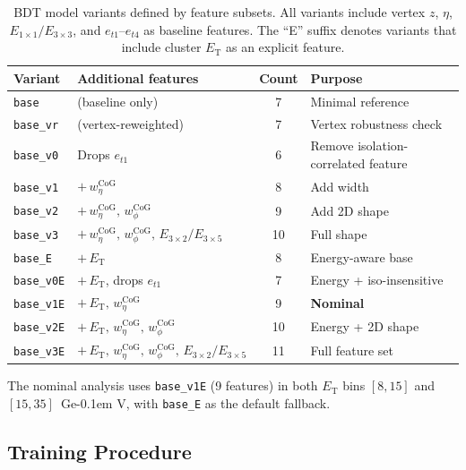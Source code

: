 \documentclass[11pt,a4paper]{article}
\newcommand{\ET}{\ensuremath{E_{\text{T}}}\xspace}
\newcommand{\GeV}{\ifmmode {\mathrm{\ Ge\kern -0.1em V}}\else\textrm{Ge\kern -0.1em V}\fi\xspace}
\begin{document}
\begin{table}[H]
    \centering
    \caption{BDT model variants defined by feature subsets. All variants include
      vertex $z$, $\eta$, $E_{1\times1}/E_{3\times3}$, and $e_{t1}$--$e_{t4}$ as
      baseline features. The ``E'' suffix denotes variants that include cluster
      \ET as an explicit feature.}
    \label{tab:bdt_variants}
    \begin{tabular}{llcl}
        \toprule
        Variant & Additional features & Count & Purpose \\
        \midrule
        \texttt{base}      & (baseline only) & 7 & Minimal reference \\
        \texttt{base\_vr}  & (vertex-reweighted) & 7 & Vertex robustness check \\
        \texttt{base\_v0}  & Drops $e_{t1}$ & 6 & Remove isolation-correlated feature \\
        \texttt{base\_v1}  & $+\,w_\eta^{\text{CoG}}$ & 8 & Add width \\
        \texttt{base\_v2}  & $+\,w_\eta^{\text{CoG}},\,w_\phi^{\text{CoG}}$ & 9 & Add 2D shape \\
        \texttt{base\_v3}  & $+\,w_\eta^{\text{CoG}},\,w_\phi^{\text{CoG}},\,E_{3\times2}/E_{3\times5}$ & 10 & Full shape \\
        \texttt{base\_E}   & $+\,\ET$ & 8 & Energy-aware base \\
        \texttt{base\_v0E} & $+\,\ET$, drops $e_{t1}$ & 7 & Energy + iso-insensitive \\
        \texttt{base\_v1E} & $+\,\ET,\,w_\eta^{\text{CoG}}$ & 9 & \textbf{Nominal} \\
        \texttt{base\_v2E} & $+\,\ET,\,w_\eta^{\text{CoG}},\,w_\phi^{\text{CoG}}$ & 10 & Energy + 2D shape \\
        \texttt{base\_v3E} & $+\,\ET,\,w_\eta^{\text{CoG}},\,w_\phi^{\text{CoG}},\,E_{3\times2}/E_{3\times5}$ & 11 & Full feature set \\
        \bottomrule
    \end{tabular}
\end{table}

The nominal analysis uses \texttt{base\_v1E} (9 features) in both \ET bins
$[8, 15]$ and $[15, 35]$~\GeV, with \texttt{base\_E} as the default fallback.

\subsection{Training Procedure}
\label{subsec:bdt_training}
\end{document}
